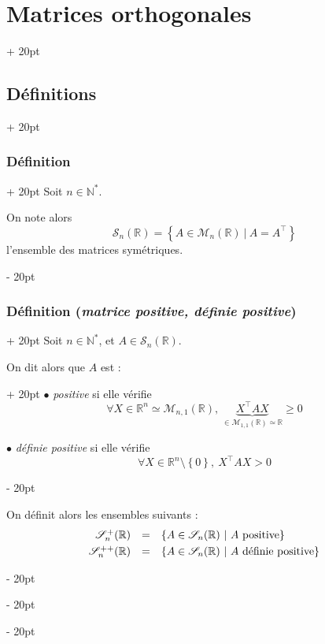 \documentclass[a4paper, 12pt, twoside]{article}
\newcommand{\N}{\mathbb{N}} %
\newcommand{\R}{\mathbb{R}} %
\newcommand{\set}[1]{\left\{ #1 \right\}}
\renewcommand{\ge}{\geqslant}
\newcommand{\ind}[1][20pt]{\advance\leftskip + #1}
\newcommand{\deind}[1][20pt]{\advance\leftskip - #1}
\newenvironment{indt}[2][20pt]{#2 \par \ind[#1]}{\par \deind} %
\begin{document}
    \begin{indt}{\section{Matrices orthogonales}}
        \begin{indt}{\subsection{Définitions}}
            \begin{indt}{\subsubsection{Définition}}
                Soit $n \in \N^*$.

                On note alors
                \[
                    \mathscr S_n(\R) = \set{A \in \mathcal M_n(\R)\ |\ A = A^\top}
                \]
                l'ensemble des matrices symétriques.
            \end{indt}

            \vspace{12pt}
            
            \begin{indt}{\subsubsection{Définition (\textit{matrice positive, définie positive})}}
                Soit $n \in \N^*$, et $A \in \mathscr S_n(\R)$.

                \begin{indt}{On dit alors que $A$ est :}
                    $\bullet$ \emph{positive} si elle vérifie
                    \[
                        \forall X \in \R^n \simeq \mathcal M_{n, 1}(\R),\
                        \underbrace{X^\top A X}_{\in \mathcal M_{1, 1}(\R) \simeq \R} \ge 0
                    \]

                    \vspace{6pt}
                    
                    $\bullet$ \emph{définie positive} si elle vérifie
                    \[
                        \forall X \in \R^n \setminus \set{0},\
                        X^\top A X > 0
                    \]
                \end{indt}

                On définit alors les ensembles suivants :
                \[
                    \begin{array}{rcl}
                        \mathscr S_n^+(\R)
                        &=& \set{A \in \mathscr S_n(\R) \ |\ A\ \text{positive}}
                        \vspace{3pt}
                        \\
                        \mathscr S_n^{++}(\R)
                        &=& \set{A \in \mathscr S_n(\R) \ |\ A\ \text{définie positive}}
                    \end{array}
                \]
            \end{indt}


\end{indt}
\end{indt}
\end{document}
